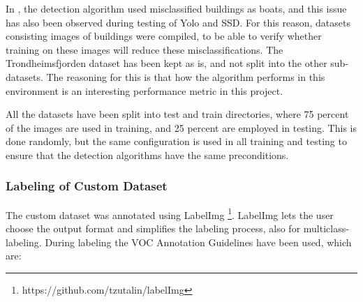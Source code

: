 In \citep{Tangstad2017}, the detection algorithm used misclassified buildings as boats, and this issue has also been observed during testing of Yolo and SSD. For this reason, datasets consisting images of buildings were compiled, to be able to verify whether training on these images will reduce these misclassifications. The Trondheimsfjorden dataset has been kept as is, and not split into the other sub-datasets. The reasoning for this is that how the algorithm performs in this environment is an interesting performance metric in this project. 


\vspace{3mm}

All the datasets have been split into test and train directories, where 75 percent of the images are used in training, and 25 percent are employed in testing. This is done randomly, but the same configuration is used in all training and testing to ensure that the detection algorithms have the same preconditions.

\subsubsection{Labeling of Custom Dataset}
\label{sec:labeling}
The custom dataset was annotated using LabelImg \footnote{https://github.com/tzutalin/labelImg}. LabelImg lets the user choose the output format and simplifies the labeling process, also for multiclass-labeling. During labeling the VOC Annotation Guidelines \citep{Everingham2012} have been used, which are:

